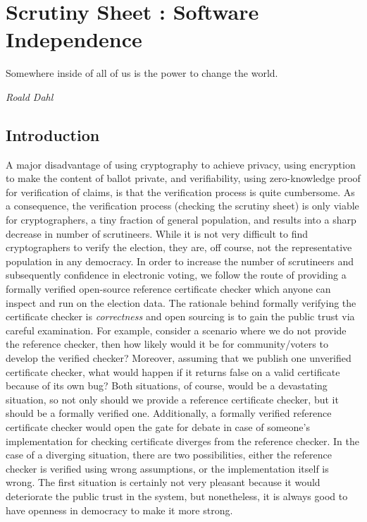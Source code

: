 \chapter{Scrutiny Sheet : Software Independence}
\label{cha:software_independence}
\setlength{\parindent}{2em}

\epigraph{Somewhere inside of all of us is the power to change the world.} 
{\textit{Roald Dahl }}

\section{Introduction}


A major disadvantage of using cryptography 
to achieve privacy,  using encryption to make the 
content of ballot private, and verifiability, using zero-knowledge proof for verification of claims,
is that the verification process  is quite cumbersome. As a consequence, the verification process 
(checking the scrutiny sheet) is only viable for
cryptographers,  a tiny fraction of general population,  and results into 
a sharp decrease in number of scrutineers. 
While it is not very difficult to find cryptographers to verify the election, 
they are, off course, not the representative population in any democracy. 
In order to increase the number of scrutineers and subsequently confidence in electronic voting, we follow the 
route of providing a formally verified open-source 
reference certificate checker which anyone can inspect and run on the election data. 
  The rationale behind formally verifying the certificate checker is \emph{correctness}
  and open sourcing is to gain the public trust  via careful examination.  
  For example, consider a scenario where we do not provide the reference checker,
  then how 
  likely would it be for community/voters to develop the 
  verified checker? Moreover, assuming that we publish one unverified certificate checker,
  what would happen if it returns false on a valid certificate because of its own bug? 
  Both situations, of course, would be a devastating situation, so not only 
  should we provide a reference certificate checker, but it should be a formally verified one. 
  Additionally, a formally verified reference certificate checker would open the gate for
  debate in case of someone's implementation for checking certificate diverges from the reference checker.
In the case of a diverging situation, there are two possibilities, either the reference checker is verified 
using wrong assumptions,  or the implementation itself is wrong.  The first situation is certainly 
not very pleasant because it would deteriorate the public trust in the system, but nonetheless, it is always
good to  have openness in democracy to make it more strong. 
 

